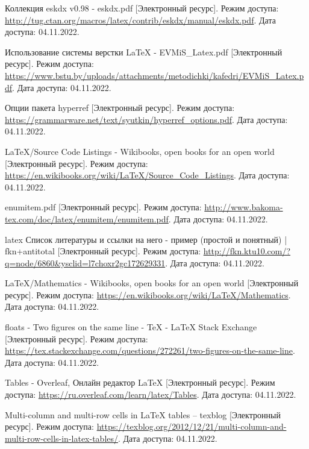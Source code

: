   \renewcommand{\addcontentsline}[3]{}%
  \renewcommand{\section}[2]{}%

  \begin{thebibliography}{}
    Коллекция eskdx v0.98 - eskdx.pdf
    [Электронный ресурс].
    Режим доступа: \url{http://tug.ctan.org/macros/latex/contrib/eskdx/manual/eskdx.pdf}.
    Дата доступа: 04.11.2022.
  
    Использование системы верстки LaTeX - EVMiS\_Latex.pdf
    [Электронный ресурс].
    Режим доступа: \url{https://www.bstu.by/uploads/attachments/metodichki/kafedri/EVMiS_Latex.pdf}.
    Дата доступа: 04.11.2022.
  
    Опции пакета hyperref
    [Электронный ресурс].
    Режим доступа: \url{https://grammarware.net/text/syutkin/hyperref_options.pdf}.
    Дата доступа: 04.11.2022.
  
    LaTeX/Source Code Listings - Wikibooks, open books for an open world
    [Электронный ресурс].
    Режим доступа: \url{https://en.wikibooks.org/wiki/LaTeX/Source_Code_Listings}.
    Дата доступа: 04.11.2022.
  
    enumitem.pdf
    [Электронный ресурс].
    Режим доступа: \url{http://www.bakoma-tex.com/doc/latex/enumitem/enumitem.pdf}.
    Дата доступа: 04.11.2022.
  
    latex Список литературы и ссылки на него - пример (простой и понятный) | fkn+antitotal
    [Электронный ресурс].
    Режим доступа: \url{http://fkn.ktu10.com/?q=node/6860&ysclid=l7choxr2gc172629331}.
    Дата доступа: 04.11.2022.

    LaTeX/Mathematics - Wikibooks, open books for an open world
    [Электронный ресурс].
    Режим доступа: \url{https://en.wikibooks.org/wiki/LaTeX/Mathematics}.
    Дата доступа: 04.11.2022.

    floats - Two figures on the same line - TeX - LaTeX Stack Exchange
    [Электронный ресурс].
    Режим доступа: \url{https://tex.stackexchange.com/questions/272261/two-figures-on-the-same-line}.
    Дата доступа: 04.11.2022.

    Tables - Overleaf, Онлайн редактор LaTeX
    [Электронный ресурс].
    Режим доступа: \url{https://ru.overleaf.com/learn/latex/Tables}.
    Дата доступа: 04.11.2022.

    Multi-column and multi-row cells in LaTeX tables – texblog
    [Электронный ресурс].
    Режим доступа: \url{https://texblog.org/2012/12/21/multi-column-and-multi-row-cells-in-latex-tables/}.
    Дата доступа: 04.11.2022.   
  \end{thebibliography}
\endgroup

\newpage
